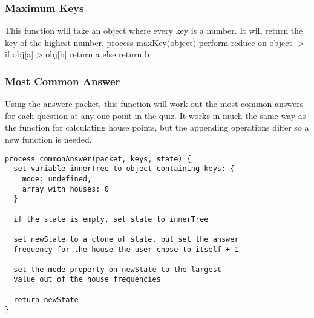 \subsubsection{Maximum Keys}
This function will take an object where every key is a number. It will return the key of the highest number.
process maxKey(object) {
  perform reduce on object ->
  if obj[a] > obj[b] return a
  else return b
}

\subsubsection{Most Common Answer}
Using the answere packet, this function will work out the most common answers for each question at any one point in the quiz. It works in much the same way as the function for calculating house points, but the appending operations differ so a new function is needed.
\begin{verbatim}
process commonAnswer(packet, keys, state) {
  set variable innerTree to object containing keys: {
    mode: undefined,
    array with houses: 0
  }

  if the state is empty, set state to innerTree

  set newState to a clone of state, but set the answer
  frequency for the house the user chose to itself + 1

  set the mode property on newState to the largest
  value out of the house frequencies

  return newState
}
\end{verbatim}

